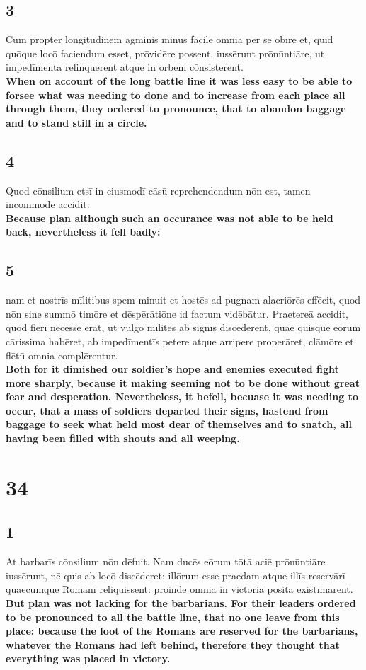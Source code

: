 \documentclass{article}
\begin{document}
\subsection*{3}
Cum propter longitūdinem agminis minus facile omnia per sē obīre et, quid quōque locō faciendum esset, prōvidēre possent, iussērunt prōnūntiāre, ut impedīmenta relinquerent atque in orbem cōnsisterent. \\
\textbf{When on account of the long battle line it was less easy to be able to forsee what was needing to done and to increase from each place all through them, they ordered to pronounce, that to abandon baggage and to stand still in a circle.}

\subsection*{4}
Quod cōnsilium etsī in eiusmodī cāsū reprehendendum nōn est, tamen incommodē accidit:\\
\textbf{Because plan although such an occurance was not able to be held back, nevertheless it fell badly:}


\subsection*{5}
nam et nostrīs mīlitibus spem minuit et hostēs ad pugnam alacriōrēs effēcit, quod nōn sine summō timōre et dēspērātiōne id factum vidēbātur. Praetereā accidit, quod fierī necesse erat, ut vulgō mīlitēs ab signīs discēderent, quae quisque eōrum cārissima habēret, ab impedīmentīs petere atque arripere properāret, clāmōre et flētū omnia complērentur.\\
\textbf{Both for it dimished our soldier's hope and enemies executed fight more sharply, because it making seeming not to be done without great fear and desperation. Nevertheless, it befell, becuase it was needing to occur, that a mass of soldiers departed their signs, hastend from baggage to seek what held most dear of themselves and to snatch, all having been filled with shouts and all weeping.}

\section*{34}
\subsection*{1}
At barbarīs cōnsilium nōn dēfuit. Nam ducēs eōrum tōtā aciē prōnūntiāre iussērunt, nē quis ab locō discēderet: illōrum esse praedam atque illīs reservārī quaecumque Rōmānī reliquissent: proinde omnia in victōriā posita existīmārent.  \\ 
\textbf{But plan was not lacking for the barbarians. For their leaders ordered to be pronounced to all the battle line, that no one leave from this place: because the loot of the Romans are reserved for the barbarians, whatever the Romans had left behind, therefore they thought that everything was placed in victory.}
\end{document}
